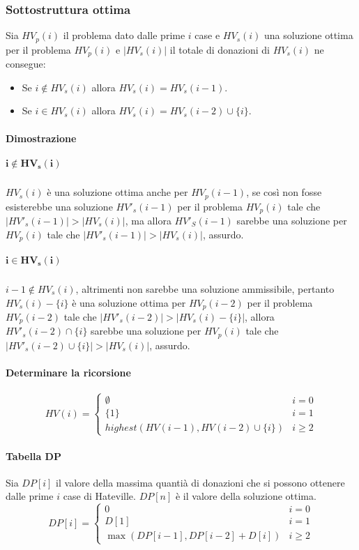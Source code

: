 \subsubsection{Sottostruttura ottima}
Sia $HV_p(i)$ il problema dato dalle prime $i$ case e $HV_s(i)$ una soluzione ottima per il problema $HV_p(i)$ e $|HV_s(i)|$ il totale di donazioni di $HV_s(i)$ ne consegue:
\begin{itemize}
\item Se $i\not\in HV_s(i)$ allora $HV_s(i) = HV_s(i-1)$.
\item Se $i\in HV_s(i)$ allora $HV_s(i) = HV_s(i-2)\cup\{i\}$.
\end{itemize}
\paragraph{Dimostrazione}
\subparagraph{$\mathbf{i\not\in HV_s(i)}$}
$HV_s(i)$ \`e una soluzione ottima anche per $HV_p(i-1)$, se cos\`i non fosse esisterebbe una soluzione $HV'_s(i-1)$ per il problema $HV_p(i)$ tale che $|HV'_s(i-1)|>|HV_s(i)|$, ma allora $HV'_S(i-1)$ sarebbe 
una soluzione per $HV_p(i)$ tale che $|HV'_s(i-1)|>|HV_s(i)|$, assurdo.
\subparagraph{$\mathbf{i\in HV_s(i)}$}
$i-1\not\in HV_s(i)$, altrimenti non sarebbe una soluzione ammissibile, pertanto $HV_s(i)-\{i\}$ \`e una soluzione ottima per $HV_p(i-2)$ per il problema $HV_p(i-2)$ tale che $|HV'_s(i-2)|>|HV_s(i)-\{i\}|$, allora
$HV'_s(i-2)\cap\{i\}$ sarebbe una soluzione per $HV_p(i)$ tale che $|HV'_s(i-2)\cup\{i\}|>|HV_s(i)|$, assurdo.
\paragraph{Determinare la ricorsione}
$$
HV(i)=
\begin{cases}
\emptyset\quad& i=0\\
\{1\} & i=1\\
highest(HV(i-1), HV(i-2)\cup\{i\}) & i\ge 2
\end{cases}
$$
\paragraph{Tabella DP}
Sia $DP[i]$ il valore della massima quanti\`a di donazioni che si possono ottenere dalle prime $i$ case di Hateville. $DP[n]$ \`e il valore della soluzione ottima.
$$
DP[i]=
\begin{cases}
0 \quad& i=0\\
D[1] & i=1\\
\max(DP[i-1], DP[i-2]+D[i]) & i\ge 2
\end{cases}
$$
